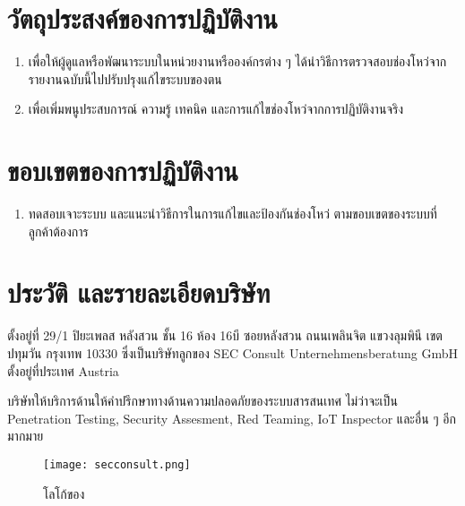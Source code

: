 \newpage
\section{วัตถุประสงค์ของการปฏิบัติงาน}
\begin{enumerate}
	\item เพื่อให้ผู้ดูแลหรือพัฒนาระบบในหน่วยงานหรือองค์กรต่าง ๆ ได้นำวิธีการตรวจสอบช่องโหว่จากรายงานฉบับนี้ไปปรับปรุงแก้ไขระบบของตน
	\item เพื่อเพิ่มพนูประสบการณ์ ความรู้ เทคนิค และการแก้ไขช่องโหว่จากการปฏิบัติงานจริง
\end{enumerate}

\section{ขอบเขตของการปฏิบัติงาน}
\begin{enumerate}
    \item ทดสอบเจาะระบบ และแนะนำวิธีการในการแก้ไขและป้องกันช่องโหว่ ตามขอบเขตของระบบที่ลูกค้าต้องการ
\end{enumerate}

\section{ประวัติ และรายละเอียดบริษัท}

\Company  ตั้งอยู่ที่ 29/1 ปิยะเพลส หลังสวน ชั้น 16 ห้อง 16บี ซอยหลังสวน ถนนเพลินจิต แขวงลุมพินี เขตปทุมวัน กรุงเทพ 10330  ซึ่งเป็นบริษัทลูกของ SEC Consult Unternehmensberatung GmbH ตั้งอยู่ที่ประเทศ Austria

บริษัทให้บริการด้านให้คำปรึกษาทางด้านความปลอดภัยของระบบสารสนเทศ ไม่ว่าจะเป็น Penetration Testing, Security Assesment, Red Teaming, IoT Inspector และอื่น ๆ อีกมากมาย

\begin{figure}[h!]
	\centering
	\texttt{[image: secconsult.png]}
	\caption{โลโก้ของ  \Company}
	\label{Fig:secconsult.png}
\end{figure}


